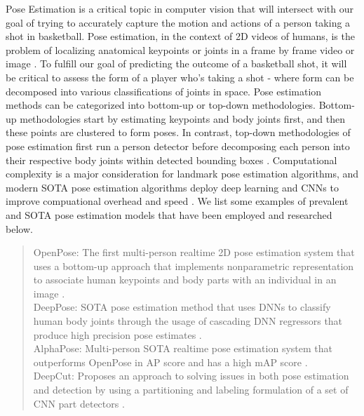 \documentclass[10pt,twocolumn,letterpaper]{article}
\begin{document}
Pose Estimation is a critical topic in computer vision that will intersect with our goal of trying to accurately capture the motion and actions of a person taking a shot in basketball. Pose estimation, in the context of 2D videos of humans, is the problem of localizing anatomical keypoints or joints in a frame by frame video or image \cite{OpenPose}. To fulfill our goal of predicting the outcome of a basketball shot, it will be critical to assess the form of a player who's taking a shot - where form can be decomposed into various classifications of joints in space. Pose estimation methods can be categorized into bottom-up or top-down methodologies. Bottom-up methodologies start by estimating keypoints and body joints first, and then these points are clustered to form poses. In contrast, 
top-down methodologies of pose estimation first run a person detector before decomposing each person into their respective body joints within detected bounding boxes \cite{Viso2}. Computational complexity is a major consideration for landmark pose estimation algorithms, and modern SOTA pose estimation algorithms deploy deep learning and CNNs to improve compuational overhead and speed \cite{OpenPose}. We list some examples of prevalent and SOTA pose estimation models that have been employed and researched below.
%
\begin{quotation}
  OpenPose: The first multi-person realtime 2D pose estimation system that uses a bottom-up approach that implements nonparametric representation to associate human keypoints and body parts with an individual in an image \cite{OpenPose}. \\
  \newline
  \indent DeepPose: SOTA pose estimation method that uses DNNs to classify human body joints through the usage of cascading DNN regressors that produce high precision pose estimates \cite{DeepPos}. \\
  \newline
  \indent AlphaPose: Multi-person SOTA realtime pose estimation system that outperforms OpenPose in AP score and has a high mAP score \cite{Alpha}. \\
  \newline
  \indent DeepCut: Proposes an approach to solving issues in both pose estimation and detection by using a partitioning and labeling formulation of a set of CNN part detectors \cite{DeepCut}.
\end{quotation}
\end{document}
